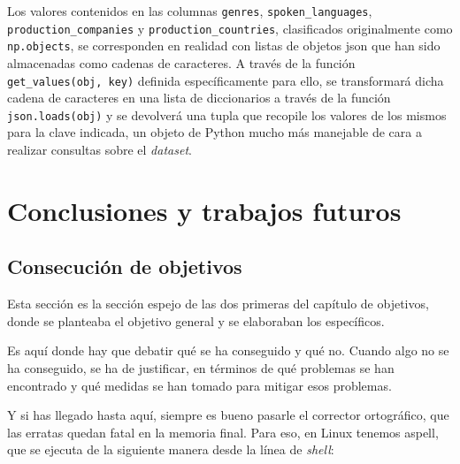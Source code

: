 \documentclass[a4paper, 12pt]{book}
\begin{document}
\begin{itemize}
    
    \begin{sloppypar} %
    \item Los valores contenidos en las columnas \texttt{genres}, \texttt{spoken\_languages}, \texttt{production\_companies} y \texttt{production\_countries}, clasificados originalmente como \texttt{np.objects}, se corresponden en realidad con listas de objetos \gls{json} que han sido almacenadas como cadenas de caracteres. A través de la función \texttt{get\_values(obj, key)} definida específicamente para ello, se transformará dicha cadena de caracteres en una lista de diccionarios a través de la función \texttt{json.loads(obj)} y se devolverá una  tupla que recopile los valores de los mismos para la clave indicada, un objeto de Python mucho más manejable de cara a realizar consultas sobre el \textit{dataset}.
    \end{sloppypar}
    
\end{itemize}

\cleardoublepage



\chapter{Conclusiones y trabajos futuros}
\label{chap:conclusiones}


\section{Consecución de objetivos}
\label{sec:consecucion-objetivos}

Esta sección es la sección espejo de las dos primeras del capítulo de objetivos, donde se planteaba el objetivo general y se elaboraban los específicos.

Es aquí donde hay que debatir qué se ha conseguido y qué no. 
Cuando algo no se ha conseguido, se ha de justificar, en términos de qué problemas se han encontrado y qué medidas se han tomado para mitigar esos problemas.

Y si has llegado hasta aquí, siempre es bueno pasarle el corrector ortográfico, que las erratas quedan fatal en la memoria final.
Para eso, en Linux tenemos aspell, que se ejecuta de la siguiente manera desde la línea de \emph{shell}:
\end{document}
